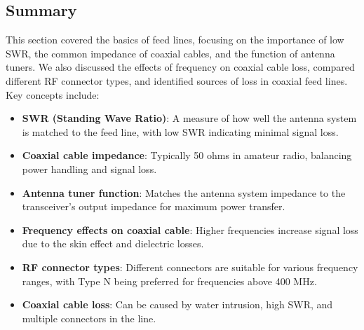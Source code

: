 
\subsection*{Summary}
This section covered the basics of feed lines, focusing on the importance of low SWR, the common impedance of coaxial cables, and the function of antenna tuners. We also discussed the effects of frequency on coaxial cable loss, compared different RF connector types, and identified sources of loss in coaxial feed lines. Key concepts include:

\begin{itemize}
    \item \textbf{SWR (Standing Wave Ratio)}: A measure of how well the antenna system is matched to the feed line, with low SWR indicating minimal signal loss.
    \item \textbf{Coaxial cable impedance}: Typically 50 ohms in amateur radio, balancing power handling and signal loss.
    \item \textbf{Antenna tuner function}: Matches the antenna system impedance to the transceiver's output impedance for maximum power transfer.
    \item \textbf{Frequency effects on coaxial cable}: Higher frequencies increase signal loss due to the skin effect and dielectric losses.
    \item \textbf{RF connector types}: Different connectors are suitable for various frequency ranges, with Type N being preferred for frequencies above 400 MHz.
    \item \textbf{Coaxial cable loss}: Can be caused by water intrusion, high SWR, and multiple connectors in the line.
\end{itemize}

